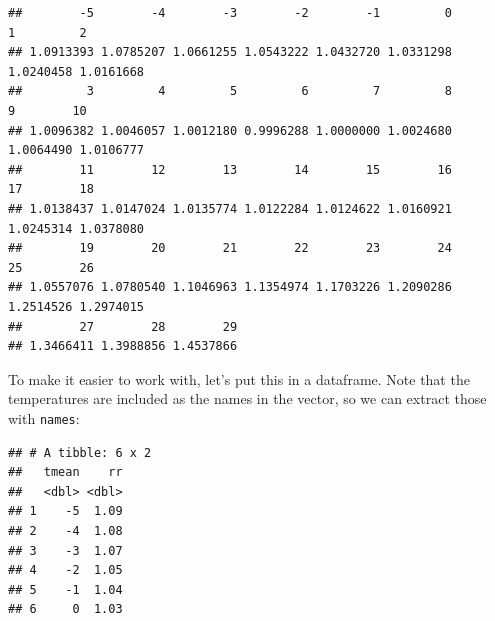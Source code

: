 \documentclass[
]{book}
\newenvironment{Shaded}{\begin{snugshade}}{\end{snugshade}}
\newcommand{\DataTypeTok}[1]{\textcolor[rgb]{0.13,0.29,0.53}{#1}}
\newcommand{\DecValTok}[1]{\textcolor[rgb]{0.00,0.00,0.81}{#1}}
\newcommand{\KeywordTok}[1]{\textcolor[rgb]{0.13,0.29,0.53}{\textbf{#1}}}
\newcommand{\NormalTok}[1]{#1}
\newcommand{\OperatorTok}[1]{\textcolor[rgb]{0.81,0.36,0.00}{\textbf{#1}}}
\newcommand{\StringTok}[1]{\textcolor[rgb]{0.31,0.60,0.02}{#1}}
\begin{document}
\begin{Shaded}
\end{Shaded}

\begin{verbatim}
##        -5        -4        -3        -2        -1         0         1         2 
## 1.0913393 1.0785207 1.0661255 1.0543222 1.0432720 1.0331298 1.0240458 1.0161668 
##         3         4         5         6         7         8         9        10 
## 1.0096382 1.0046057 1.0012180 0.9996288 1.0000000 1.0024680 1.0064490 1.0106777 
##        11        12        13        14        15        16        17        18 
## 1.0138437 1.0147024 1.0135774 1.0122284 1.0124622 1.0160921 1.0245314 1.0378080 
##        19        20        21        22        23        24        25        26 
## 1.0557076 1.0780540 1.1046963 1.1354974 1.1703226 1.2090286 1.2514526 1.2974015 
##        27        28        29 
## 1.3466411 1.3988856 1.4537866
\end{verbatim}

To make it easier to work with, let's put this in a dataframe. Note that the temperatures
are included as the names in the vector, so we can extract those with \texttt{names}:

\begin{Shaded}
\end{Shaded}

\begin{verbatim}
## # A tibble: 6 x 2
##   tmean    rr
##   <dbl> <dbl>
## 1    -5  1.09
## 2    -4  1.08
## 3    -3  1.07
## 4    -2  1.05
## 5    -1  1.04
## 6     0  1.03
\end{verbatim}
\end{document}
